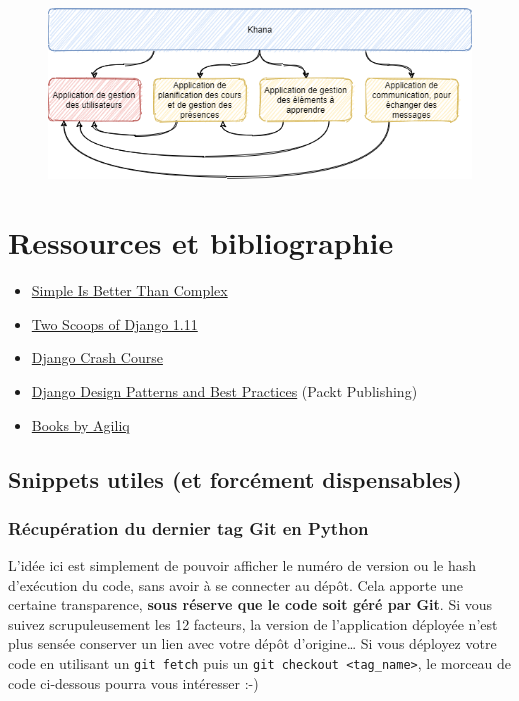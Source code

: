 \documentclass[11pt]{amsbook}
\begin{document}
\begin{figure}[h]{}
\centering\includegraphics[width=2.5truein]{images/django/django-project-vs-apps-khana.png}
\caption{}

\end{figure}

\hypertarget{x-ressources-et-bibliographie}{\part*{Ressources et bibliographie}}
\begin{itemize}

\item \href{https://simpleisbetterthancomplex.com/series/beginners-guide/1.11/}{Simple Is Better Than Complex}

\item \href{https://www.feldroy.com/collections/two-scoops-press/products/two-scoops-of-django-1-11}{Two Scoops of Django 1.11}

\item \href{https://www.feldroy.com/products/django-crash-course}{Django Crash Course}

\item \href{https://www.amazon.com/dp/B07BDGC57}{Django Design Patterns and Best Practices} (Packt Publishing)

\item \href{https://books.agiliq.com/en/latest/README.html}{Books by Agiliq}

\end{itemize}


\hypertarget{x-snippets-utiles-(et-forcément-dispensables)}{\chapter{Snippets utiles (et forcément dispensables)}}
\hypertarget{x-récupération-du-dernier-tag-git-en-python}{\section{Récupération du dernier tag Git en Python}}
L’idée ici est simplement de pouvoir afficher le numéro de version ou le hash d’exécution du code, sans avoir à se connecter au dépôt. Cela apporte une certaine transparence, \textbf{sous réserve que le code soit géré par Git}. Si vous suivez scrupuleusement les 12 facteurs, la version de l’application déployée n’est plus sensée conserver un lien avec votre dépôt d’origine…​ Si vous déployez votre code en utilisant un \texttt{git fetch} puis un \texttt{git checkout <tag\_name>}, le morceau de code ci-dessous pourra vous intéresser :-)
\end{document}
